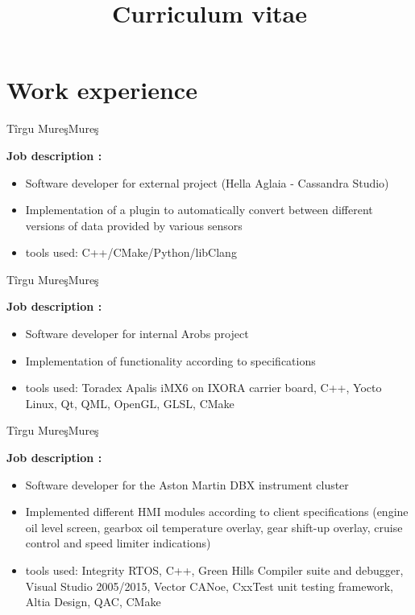 \documentclass[14pt,a4paper,sans]{moderncv}   %
\title{Curriculum vitae}                     %
\begin{document}
\maketitle

\section{Work experience}

 {T\^{i}rgu Mure\c{s}}{Mure\c{s}}{
\textbf{Job description :}
\begin{itemize}
\item Software developer for external project (Hella Aglaia - Cassandra Studio)
\item Implementation of a plugin to automatically convert between different versions of data provided by various sensors
\item tools used: C++/CMake/Python/libClang
\end{itemize}}

 {T\^{i}rgu Mure\c{s}}{Mure\c{s}}{
\textbf{Job description :}
\begin{itemize}
\item Software developer for internal Arobs project
\item Implementation of functionality according to specifications
\item tools used: Toradex Apalis iMX6 on IXORA carrier board, C++, Yocto Linux, Qt, QML, OpenGL, GLSL, CMake
\end{itemize}}

 {T\^{i}rgu Mure\c{s}}{Mure\c{s}}{
\textbf{Job description :}
\begin{itemize}
\item Software developer for the Aston Martin DBX instrument cluster
\item Implemented different HMI modules according to client specifications 
(engine oil level screen, gearbox oil temperature overlay, gear shift-up overlay,
cruise control and speed limiter indications)
\item tools used: Integrity RTOS, C++, Green Hills Compiler suite and debugger, Visual Studio
2005/2015, Vector CANoe, CxxTest unit testing framework, Altia Design, QAC, CMake
\end{itemize}}
\end{document}
